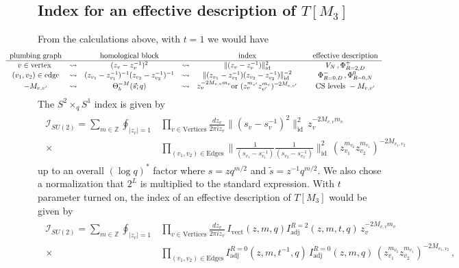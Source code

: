 \documentclass[11pt,hyper,a4paper]{article}
\begin{document}

\subsection{Index for an effective description of $T[M_3]$}

From the calculations above, with $t=1$ we would have 
\begin{equation}\hspace{-15mm}
\begin{array}{ c c c c c c c}
\text{plumbing graph}	&			&\text{homological block}	&		&\text{index}				&		&\text{effective description}		\\
\hline	
v \in \text{vertex }		&\leadsto		&(z_v-z_v^{-1})^2		&\leadsto	&\|(z_v-z_v^{-1})\|_{\text{id}}^2	&	&V_N \, , \Phi^{+}_{R=2,D}	\\
(v_1, v_2) \in \text{edge}		&\leadsto		&(z_{v_1}-z_{v_1}^{-1})^{-1} (z_{v_2}-z_{v_2}^{-1})^{-1}		&\leadsto	&\|(z_{v_1}-z_{v_1}^{-1}) (z_{v_2}-z_{v_2}^{-1})\|_{\text{id}}^{-2}	&	&\Phi^{-}_{R=0,D} \, , \Phi^{0}_{R=0,N}	\\
-M_{v,v'}				&\leadsto		&\Theta^{-M}_b(\vec{s};q)	&\leadsto	&z_v^{-2M_{v,v} m_v} \text{or } (z_{v}^{m_{v'}} z_{v'}^{m_{v}})^{-2M_{v,v'}}	&	&\text{CS levels } -M_{v,v'}
\end{array}
\end{equation}
The $S^2 \times_q S^1$ index is given by
\begin{align}
\begin{split}
\mathcal{I}_{SU(2)} = \sum_{m \in \mathbb{Z}} \oint_{|z_v|=1} &\prod_{v \in \text{Vertices}} \frac{dz_v}{2\pi i z_v} \big\|(s_v - s_v^{-1})^{2} \big\|_{\text{id}}^2 \,	 z_v^{-2M_{v,v} m_v}\\
\times & \prod_{(v_1,v_2) \in \text{Edges}} \bigg\| \frac{1}{(s_{v_1}-s_{v_1}^{-1})} \frac{1}{(s_{v_2}-s_{v_2}^{-1})} \bigg\|_{\text{id}}^2 \,	 (z_{v_1}^{m_{v_2}} z_{v_2}^{m_{v_1}})^{-2M_{v_1,v_2}}	\,	
\end{split}	\label{plmb-ind}
\end{align}
up to an overall $(\log q)^*$ factor where $s=z q^{m/2}$ and $\tilde{s}=z^{-1} q^{m/2}$.
We also chose a normalization that $2^L$ is multiplied to the standard expression.
With $t$ parameter turned on, the index of an effective description of $T[M_3]$ would be given by
\begin{align}
\begin{split}
\mathcal{I}_{SU(2)} = \sum_{m \in \mathbb{Z}} \oint_{|z_v|=1} &\prod_{v \in \text{Vertices}} \frac{dz_v}{2\pi i z_v} \, I_{\text{vect}}(z,m,q) I_{\text{adj}}^{R=2} (z,m,t, q) \, 	 z_v^{-2M_{v,v} m_v}\\
\times & \prod_{(v_1,v_2) \in \text{Edges}} I_{\text{adj}}^{R=0}(z,m,t^{-1},q) \, I_{\text{adj}}^{R=0}(z,m ,q) \,	 (z_{v_1}^{m_{v_2}} z_{v_2}^{m_{v_1}})^{-2M_{v_1,v_2}}	\,	,
\end{split}	\label{plmb-ind-t}
\end{align}
\end{document}
